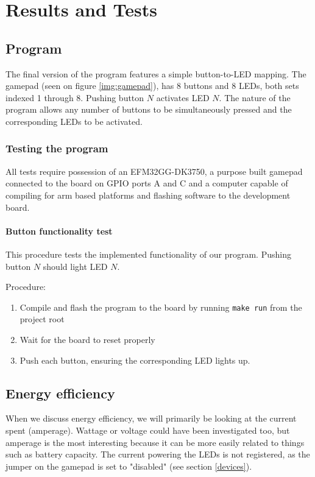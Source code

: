 \chapter{Results and Tests}
\label{chap:results}
\section{Program}
The final version of the program features a simple button-to-LED mapping. The gamepad (seen on figure \ref{img:gamepad}), has 8 buttons and 8 LEDs, both sets indexed 1 through 8. Pushing button $N$ activates LED $N$. The nature of the program allows any number of buttons to be simultaneously pressed and the corresponding LEDs to be activated.

\subsection{Testing the program}
All tests require possession of an EFM32GG-DK3750, a purpose built gamepad connected to the board on GPIO ports A and C and a computer capable of compiling for arm based platforms and flashing software to the development board.

\subsubsection{Button functionality test}

This procedure tests the implemented functionality of our program. Pushing button $N$ should light LED $N$.

Procedure:

\begin{enumerate}
\item Compile and flash the program to the board by running \texttt{make run} from the project root
\item Wait for the board to reset properly
\item Push each button, ensuring the corresponding LED lights up.
\end{enumerate}


\section{Energy efficiency}
When we discuss energy efficiency, we will primarily be looking at the current spent (amperage). Wattage or voltage could have been investigated too, but amperage is the most interesting because it can be more easily related to things such as battery capacity. The current powering the LEDs is not registered, as the jumper on the gamepad is set to "disabled" (see section \ref{devices}).

